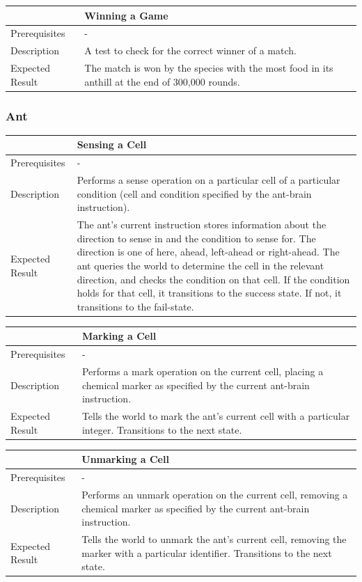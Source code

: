 \documentclass[11pt]{article}
\begin{document}
\begin{longtable}[c]{@{}p{}p{}@{}}
\toprule
& Winning a Game \tabularnewline
\midrule
Prerequisites & - \tabularnewline
Description & A test to check for the correct winner of a match. \tabularnewline
Expected Result & The match is won by the species with the most food in
its anthill at the end of 300,000 rounds.\tabularnewline
\bottomrule
\end{longtable}

\subsubsection{Ant}\label{ant}

\begin{longtable}[c]{@{}p{}p{}@{}}
\toprule
& Sensing a Cell \tabularnewline
\midrule
Prerequisites & - \tabularnewline
Description & Performs a sense operation on a particular cell of a
particular condition (cell and condition specified by the ant-brain
instruction). \tabularnewline
Expected Result & The ant's current instruction stores information about
the direction to sense in and the condition to sense for. The direction
is one of here, ahead, left-ahead or right-ahead. The ant queries the
world to determine the cell in the relevant direction, and checks the
condition on that cell. If the condition holds for that cell, it
transitions to the success state. If not, it transitions to the
fail-state. \tabularnewline
\bottomrule
\end{longtable}

\begin{longtable}[c]{@{}p{}p{}@{}}
\toprule
& Marking a Cell \tabularnewline
\midrule
Prerequisites & - \tabularnewline
Description & Performs a mark operation on the current cell, placing
a chemical marker as specified by the current ant-brain instruction. \tabularnewline
Expected Result & Tells the world to mark the ant's current cell with a
particular integer. Transitions to the next state. \tabularnewline
\bottomrule
\end{longtable}

\begin{longtable}[c]{@{}p{}p{}@{}}
\toprule
& Unmarking a Cell \tabularnewline
\midrule
Prerequisites & - \tabularnewline
Description & Performs an unmark operation on the current cell,
removing a chemical marker as specified by the current ant-brain
instruction. \tabularnewline
Expected Result & Tells the world to unmark the ant's current cell,
removing the marker with a particular identifier. Transitions to the
next state. \tabularnewline
\bottomrule
\end{longtable}
\end{document}
